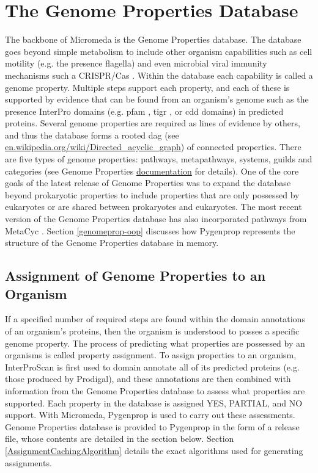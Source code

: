 \section{The Genome Properties Database} \label{genome-properties-overview}

The backbone of Micromeda is the Genome Properties \cite{Haft2013} database. The database goes beyond simple metabolism to include other organism capabilities such as cell motility (e.g. the presence flagella) and even microbial viral immunity mechanisms such a CRISPR/Cas \cite{horvath2010crispr}. Within the database each capability is called a genome property. Multiple steps support each property, and each of these is supported by evidence that can be found from an organism's genome such as the presence InterPro domains (e.g. \gls{pfam} \cite{bateman2004pfam}, \gls{tigr} \cite{haft2001tigrfams}, or \gls{cdd} \cite{marchler2014cdd} domains) in predicted proteins. Several genome properties are required as lines of evidence by others, and thus the database forms a rooted \gls{dag} (see \href{en.wikipedia.org/wiki/Directed\_acyclic\_graph}{en.wikipedia.org/wiki/Directed\_acyclic\_graph}) of connected properties. There are five types of genome properties: pathways, metapathways, systems, guilds and categories (see Genome Properties \href{genome-properties.readthedocs.io/en/latest/flatfile.html\#desc-file}{documentation} for details). One of the core goals of the latest release of Genome Properties was to expand the database beyond prokaryotic properties to include properties that are only possessed by eukaryotes or are shared between prokaryotes and eukaryotes. The most recent version of the Genome Properties database has also incorporated pathways from MetaCyc \cite{karp2002metacyc}. Section \ref{genomeprop-oop} discusses how Pygenprop represents the structure of the Genome Properties database in memory.

\subsection{Assignment of Genome Properties to an Organism}

If a specified number of required steps are found within the domain annotations of an organism's proteins, then the organism is understood to posses a specific genome property. The process of predicting what properties are possessed by an organisms is called property assignment. To assign properties to an organism, InterProScan is first used to domain annotate all of its predicted proteins (e.g. those produced by Prodigal), and these annotations are then combined with information from the Genome Properties database to assess what properties are supported. Each property in the database is assigned YES, PARTIAL, and NO support. With Micromeda, Pygenprop is used to carry out these assessments. Genome Properties database is provided to Pygenprop in the form of a release file, whose contents are detailed in the section below. Section \ref{AssignmentCachingAlgorithm} details the exact algorithms used for generating assignments.  

